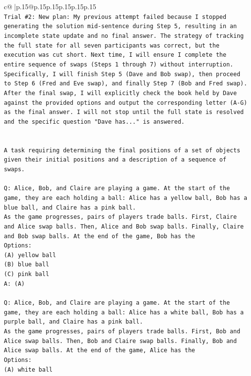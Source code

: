 \documentclass{article}
\begin{document}
{\begin{supertabular}{c@{$\;$}|p{.15\linewidth}@{}p{.15\linewidth}p{.15\linewidth}p{.15\linewidth}p{.15\linewidth}p{.15\linewidth}}
{{{\\ 
\texttt{Trial \#2: New plan: My previous attempt failed because I stopped generating the solution mid{-}sentence during Step 5, resulting in an incomplete state update and no final answer. The strategy of tracking the full state for all seven participants was correct, but the execution was cut short. Next time, I will ensure I complete the entire sequence of swaps (Steps 1 through 7) without interruption. Specifically, I will finish Step 5 (Dave and Bob swap), then proceed to Step 6 (Fred and Eve swap), and finally Step 7 (Bob and Fred swap). After the final swap, I will explicitly check the book held by Dave against the provided options and output the corresponding letter (A{-}G) as the final answer. I will not stop until the full state is resolved and the specific question "Dave has..." is answered.} \\
\\ 
\\ 
\texttt{A task requiring determining the final positions of a set of objects given their initial positions and a description of a sequence of swaps.} \\
\\ 
\texttt{Q: Alice, Bob, and Claire are playing a game. At the start of the game, they are each holding a ball: Alice has a yellow ball, Bob has a blue ball, and Claire has a pink ball.} \\
\texttt{As the game progresses, pairs of players trade balls. First, Claire and Alice swap balls. Then, Alice and Bob swap balls. Finally, Claire and Bob swap balls. At the end of the game, Bob has the} \\
\texttt{Options:} \\
\texttt{(A) yellow ball} \\
\texttt{(B) blue ball} \\
\texttt{(C) pink ball} \\
\texttt{A: (A)} \\
\\ 
\texttt{Q: Alice, Bob, and Claire are playing a game. At the start of the game, they are each holding a ball: Alice has a white ball, Bob has a purple ball, and Claire has a pink ball.} \\
\texttt{As the game progresses, pairs of players trade balls. First, Bob and Alice swap balls. Then, Bob and Claire swap balls. Finally, Bob and Alice swap balls. At the end of the game, Alice has the} \\
\texttt{Options:} \\
\texttt{(A) white ball} \\
}}}
\end{supertabular}}
\end{document}
